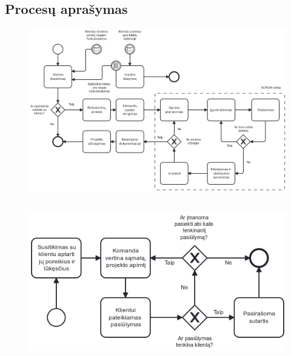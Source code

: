 



\begin{landscape}
\section{Procesų aprašymas}
\thispagestyle{empty}
\begin{figure}[H]%
    \centering
    \includegraphics[width=0.9\linewidth]{etc/diagrams/processes.png}
\end{figure}
\end{landscape}

\subsection{} %

\begin{figure}[H]%
    \centering
    \includegraphics[width=0.75\linewidth]{etc/diagrams/engage-client.png}
\end{figure}

